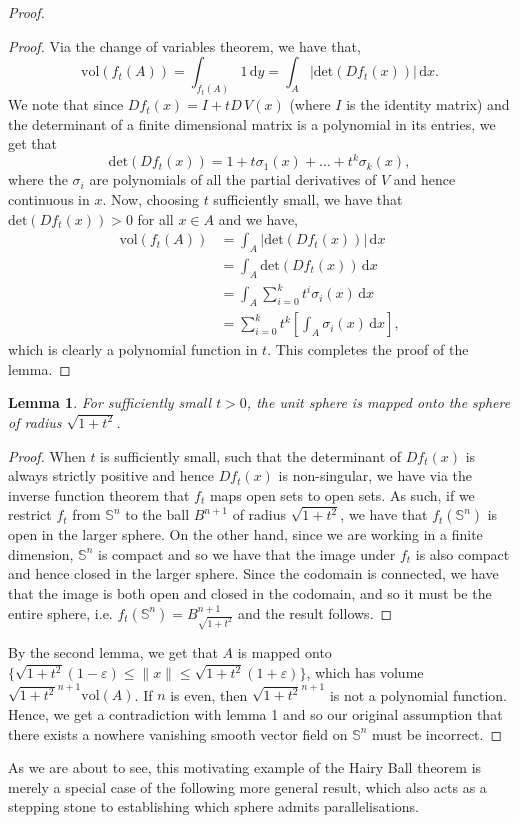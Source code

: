 \documentclass[12pt,a4paper]{article}
\numberwithin{equation}{section}
\newtheorem{lemma}{Lemma}[section]
\theoremstyle{definition}
\theoremstyle{remark}
\begin{document}
\begin{proof}
\begin{proof}
Via the change of variables theorem, we have that,
\[
\mathrm{vol}(f_t(A))=\int_{f_t(A)}1\,\mathrm{d}y=\int_A|\mathrm{det}(Df_t(x))|\,\mathrm{d}x.
\]
We note that since $Df_t(x)=I+tD\,V(x)$ (where $I$ is the identity matrix) and the determinant of a finite dimensional matrix is a polynomial in its entries, we get that \[\mathrm{det}(Df_t(x))=1+t\sigma_1(x)+\ldots+t^k\sigma_k(x),\] where the $\sigma_i$ are polynomials of all the partial derivatives of $V$ and hence continuous in $x$. Now, choosing $t$ sufficiently small, we have that $\mathrm{det}(Df_t(x))>0$ for all $x\in A$ and we have,
\begin{align*}
\mathrm{vol}(f_t(A))&=\int_A|\mathrm{det}(Df_t(x))|\,\mathrm{d}x\\
&=\int_A\mathrm{det}(Df_t(x))\,\mathrm{d}x\\
&=\int_A\sum_{i=0}^kt^i\sigma_i(x)\,\mathrm{d}x\\
&=\sum_{i=0}^kt^k\left[\int_A\sigma_i(x)\,\mathrm{d}x\right],
\end{align*}
which is clearly a polynomial function in $t$. This completes the proof of the lemma.
\end{proof}
\begin{lemma}
For sufficiently small $t>0$, the unit sphere is mapped onto the sphere of radius $\sqrt{1+t^2}$.
\end{lemma}
\begin{proof}
When $t$ is sufficiently small, such that the determinant of $Df_t(x)$ is always strictly positive and hence $Df_t(x)$ is non-singular, we have via the inverse function theorem that $f_t$ maps open sets to open sets. As such, if we restrict $f_t$ from $\mathbb{S}^n$ to the ball $B^{n+1}$ of radius $\sqrt{1+t^2}$, we have that $f_t(\mathbb{S}^n)$ is open in the larger sphere. On the other hand, since we are working in a finite dimension, $\mathbb{S}^n$ is compact and so we have that the image under $f_t$ is also compact and hence closed in the larger sphere. Since the codomain is connected, we have that the image is both open and closed in the codomain, and so it must be the entire sphere, i.e. $f_t(\mathbb{S}^n)=B^{n+1}_{\sqrt{1+t^2}}$ and the result follows. 
\end{proof}
By the second lemma, we get that $A$ is mapped onto $\{\sqrt{1+t^2}(1-\varepsilon)\leq\|x\|\leq\sqrt{1+t^2}(1+\varepsilon)\}$, which has volume $\sqrt{1+t^2}^{n+1}\mathrm{vol}(A)$. If $n$ is even, then $\sqrt{1+t^2}^{n+1}$ is not a polynomial function. Hence, we get a contradiction with lemma 1 and so our original assumption that there exists a nowhere vanishing smooth vector field on $\mathbb{S}^n$ must be incorrect.
\end{proof}
As we are about to see, this motivating example of the Hairy Ball theorem is merely a special case of the following more general result, which also acts as a stepping stone to establishing which sphere admits parallelisations.\\
\end{document}
